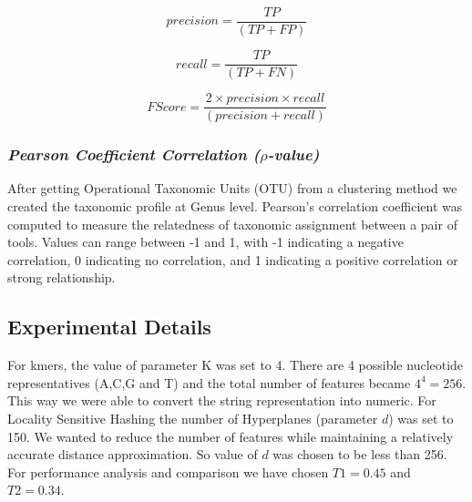\documentclass[10pt, conference, compsocconf]{IEEEtran}
\begin{document}
\begin{equation}
precision = \frac{TP}{(TP + FP)}
\end{equation}

\begin{equation}
recall = \frac{TP}{(TP + FN)}
\end{equation}

\begin{equation}
F Score = \frac{2 \times precision \times recall}{(precision + recall)}
\end{equation}

\subsubsection{\textit{Pearson Coefficient Correlation ($\rho$-value)}}
After getting Operational Taxonomic Units (OTU) from a clustering method we created the taxonomic profile at Genus level. Pearson’s correlation coefficient was computed to measure the relatedness of taxonomic assignment between a pair of tools. Values can range between -1 and 1, with -1 indicating a negative correlation, 0 indicating no correlation, and 1 indicating a positive correlation or strong relationship.


\subsection{\textbf{Experimental Details}}

For kmers, the value of parameter K was set to 4. There are 4 possible nucleotide representatives (A,C,G and T) and the total number of features became $4^4=256$. This way we were able to convert the string representation into numeric. For Locality Sensitive Hashing the number of Hyperplanes (parameter $d$) was set to 150. We wanted to reduce the number of features while maintaining a relatively accurate distance approximation. So value of $d$ was chosen to be less than 256. For performance analysis and comparison we have chosen $T1=0.45$ and $T2=0.34$.         
\end{document}
